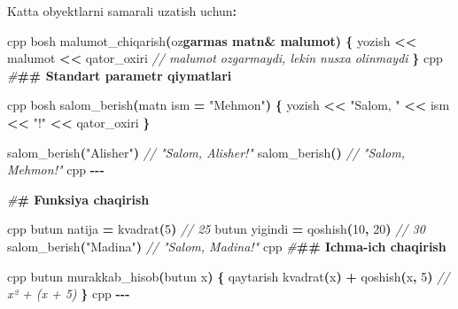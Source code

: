 \documentclass[a4paper,11pt,twoside,openright]{book}
\newenvironment{Shaded}{\begin{snugshade}}{\end{snugshade}}
\newcommand{\CharTok}[1]{\textcolor[rgb]{0.31,0.60,0.02}{#1}}
\newcommand{\CommentTok}[1]{\textcolor[rgb]{0.56,0.35,0.01}{\textit{#1}}}
\newcommand{\DecValTok}[1]{\textcolor[rgb]{0.00,0.00,0.81}{#1}}
\newcommand{\ErrorTok}[1]{\textcolor[rgb]{0.64,0.00,0.00}{\textbf{#1}}}
\newcommand{\NormalTok}[1]{#1}
\newcommand{\OperatorTok}[1]{\textcolor[rgb]{0.81,0.36,0.00}{\textbf{#1}}}
\newcommand{\PreprocessorTok}[1]{\textcolor[rgb]{0.56,0.35,0.01}{\textit{#1}}}
\newcommand{\StringTok}[1]{\textcolor[rgb]{0.31,0.60,0.02}{#1}}
\begin{document}
\begin{Shaded}
\begin{Highlighting}[]
\NormalTok{Katta obyektlarni samarali uzatish uchun}\OperatorTok{:}

\ErrorTok{\textasciigrave{}\textasciigrave{}\textasciigrave{}}\NormalTok{cpp}
\NormalTok{bosh malumot\_chiqarish}\OperatorTok{(}\NormalTok{o}\CharTok{\textquotesingle{}z}\ErrorTok{garmas matn\& malumot) \{}
\NormalTok{    yozish }\OperatorTok{\textless{}\textless{}}\NormalTok{ malumot }\OperatorTok{\textless{}\textless{}}\NormalTok{ qator\_oxiri}
    \CommentTok{// malumot o\textquotesingle{}zgarmaydi, lekin nusxa olinmaydi}
\OperatorTok{\}}
\ErrorTok{\textasciigrave{}\textasciigrave{}\textasciigrave{}}\NormalTok{cpp}
\PreprocessorTok{\#}\ErrorTok{\#\# Standart parametr qiymatlari}

\ErrorTok{\textasciigrave{}\textasciigrave{}\textasciigrave{}}\NormalTok{cpp}
\NormalTok{bosh salom\_berish}\OperatorTok{(}\NormalTok{matn ism }\OperatorTok{=} \StringTok{"Mehmon"}\OperatorTok{)} \OperatorTok{\{}
\NormalTok{    yozish }\OperatorTok{\textless{}\textless{}} \StringTok{"Salom, "} \OperatorTok{\textless{}\textless{}}\NormalTok{ ism }\OperatorTok{\textless{}\textless{}} \StringTok{"!"} \OperatorTok{\textless{}\textless{}}\NormalTok{ qator\_oxiri}
\OperatorTok{\}}

\NormalTok{salom\_berish}\OperatorTok{(}\StringTok{"Alisher"}\OperatorTok{)}   \CommentTok{// "Salom, Alisher!"}
\NormalTok{salom\_berish}\OperatorTok{()}            \CommentTok{// "Salom, Mehmon!"}
\ErrorTok{\textasciigrave{}\textasciigrave{}\textasciigrave{}}\NormalTok{cpp}
\OperatorTok{{-}{-}{-}}

\PreprocessorTok{\#}\ErrorTok{\# Funksiya chaqirish}

\ErrorTok{\textasciigrave{}\textasciigrave{}\textasciigrave{}}\NormalTok{cpp}
\NormalTok{butun natija }\OperatorTok{=}\NormalTok{ kvadrat}\OperatorTok{(}\DecValTok{5}\OperatorTok{)}          \CommentTok{// 25}
\NormalTok{butun yigindi }\OperatorTok{=}\NormalTok{ qoshish}\OperatorTok{(}\DecValTok{10}\OperatorTok{,} \DecValTok{20}\OperatorTok{)}    \CommentTok{// 30}
\NormalTok{salom\_berish}\OperatorTok{(}\StringTok{"Madina"}\OperatorTok{)}             \CommentTok{// "Salom, Madina!"}
\ErrorTok{\textasciigrave{}\textasciigrave{}\textasciigrave{}}\NormalTok{cpp}
\PreprocessorTok{\#}\ErrorTok{\#\# Ichma{-}ich chaqirish}

\ErrorTok{\textasciigrave{}\textasciigrave{}\textasciigrave{}}\NormalTok{cpp}
\NormalTok{butun murakkab\_hisob}\OperatorTok{(}\NormalTok{butun x}\OperatorTok{)} \OperatorTok{\{}
\NormalTok{    qaytarish kvadrat}\OperatorTok{(}\NormalTok{x}\OperatorTok{)} \OperatorTok{+}\NormalTok{ qoshish}\OperatorTok{(}\NormalTok{x}\OperatorTok{,} \DecValTok{5}\OperatorTok{)}   \CommentTok{// x² + (x + 5)}
\OperatorTok{\}}
\ErrorTok{\textasciigrave{}\textasciigrave{}\textasciigrave{}}\NormalTok{cpp}
\OperatorTok{{-}{-}{-}}


\end{Highlighting}
\end{Shaded}
\end{document}
